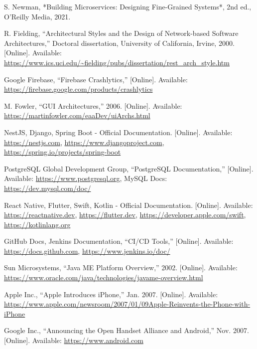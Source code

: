 \documentclass[12pt]{report}
\begin{document}
\begin{thebibliography}{1}


  
  S. Newman, *Building Microservices: Designing Fine-Grained Systems*, 2nd ed., O'Reilly Media, 2021.

  R. Fielding, “Architectural Styles and the Design of Network-based Software Architectures,” Doctoral dissertation, University of California, Irvine, 2000. [Online]. Available: \url{https://www.ics.uci.edu/~fielding/pubs/dissertation/rest_arch_style.htm}
  
  Google Firebase, “Firebase Crashlytics,” [Online]. Available: \url{https://firebase.google.com/products/crashlytics}
  
  M. Fowler, “GUI Architectures,” 2006. [Online]. Available: \url{https://martinfowler.com/eaaDev/uiArchs.html}
  
  NestJS, Django, Spring Boot - Official Documentation. [Online]. Available: \url{https://nestjs.com}, \url{https://www.djangoproject.com}, \url{https://spring.io/projects/spring-boot}
  
  PostgreSQL Global Development Group, “PostgreSQL Documentation,” [Online]. Available: \url{https://www.postgresql.org}, MySQL Docs: \url{https://dev.mysql.com/doc/}
  
  React Native, Flutter, Swift, Kotlin - Official Documentation. [Online]. Available: \url{https://reactnative.dev}, \url{https://flutter.dev}, \url{https://developer.apple.com/swift}, \url{https://kotlinlang.org}
  
  GitHub Docs, Jenkins Documentation, “CI/CD Tools,” [Online]. Available: \url{https://docs.github.com}, \url{https://www.jenkins.io/doc/}
  
  Sun Microsystems, ``Java ME Platform Overview,'' 2002. [Online]. Available: \url{https://www.oracle.com/java/technologies/javame-overview.html}

  Apple Inc., ``Apple Introduces iPhone,'' Jan. 2007. [Online]. Available: \url{https://www.apple.com/newsroom/2007/01/09Apple-Reinvents-the-Phone-with-iPhone}

  Google Inc., ``Announcing the Open Handset Alliance and Android,'' Nov. 2007. [Online]. Available: \url{https://www.android.com}
  

\end{thebibliography}
\end{document}
